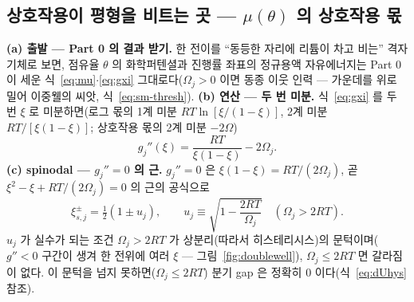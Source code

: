 \documentclass[11pt,a4paper]{article}
\begin{document}
\subsection{상호작용이 평형을 비트는 곳 — $\mu(\theta)$ 의 상호작용 몫}
\textbf{(a) 출발 --- Part 0 의 결과 받기.} 한 전이를 ``동등한 자리에 리튬이 차고 비는'' 격자기체로 보면,
점유율 $\theta$ 의 화학퍼텐셜과 진행률 좌표의 정규용액 자유에너지는 Part 0 이 세운
식~\eqref{eq:mu}$\cdot$\eqref{eq:gxi} 그대로다($\Omega_j>0$ 이면 동종 이웃 인력 --- 가운데를 위로 밀어
이중웰의 씨앗, 식~\eqref{eq:sm-thresh}). \textbf{(b) 연산 --- 두 번 미분.}
식~\eqref{eq:gxi} 를 두 번 $\xi$ 로 미분하면(로그 몫의 1계 미분 $RT\ln[\xi/(1-\xi)]$, 2계 미분
$RT/[\xi(1-\xi)]$; 상호작용 몫의 2계 미분 $-2\Omega$)
\begin{equation}
g_j''(\xi)=\frac{RT}{\xi(1-\xi)}-2\Omega_j.
\label{eq:gpp}
\end{equation}
\textbf{(c) spinodal — $g_j''=0$ 의 근.} $g_j''=0$ 은 $\xi(1-\xi)=RT/(2\Omega_j)$, 곧 $\xi^2-\xi+RT/(2\Omega_j)=0$
의 근의 공식으로
\begin{equation}
\xi_{s,j}^\pm=\tfrac12(1\pm u_j),\qquad
u_j\equiv\sqrt{1-\frac{2RT}{\Omega_j}}\quad(\Omega_j>2RT).
\label{eq:spinodal}
\end{equation}
$u_j$ 가 실수가 되는 조건 $\Omega_j>2RT$ 가 상분리(따라서 히스테리시스)의 문턱이며($g''<0$ 구간이 생겨 한 전위에 여러
$\xi$ — 그림~\ref{fig:doublewell}), $\Omega_j\le2RT$ 면 갈라짐이 없다. 이 문턱을 넘지 못하면($\Omega_j\le2RT$) 분기 gap 은 정확히 0 이다(식~\eqref{eq:dUhys} 참조).
\end{document}
